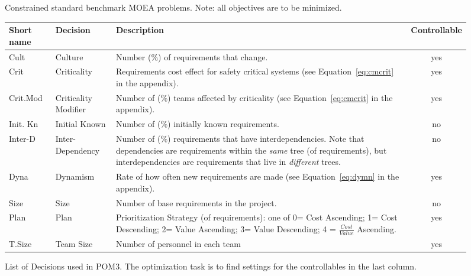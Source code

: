 \documentclass[10pt,journal,compsoc]{IEEEtran}
\newcommand{\eq}[1]{Equation~\ref{eq:#1}}
\begin{document}
\begin{figure*}
		\caption{Constrained standard benchmark MOEA problems. Note: all objectives
are to be  minimized.}\label{fig:con}
\end{figure*}


\begin{figure*}%
\scriptsize
    \centering
    \begin{tabular}{|l|l|p{4in}|c|}
        \hline
        Short name &Decision             & Description         &Controllable                                        \\ \hline
        Cult&Culture              & Number (\%) of requirements that change. & yes \\\hline
        Crit&Criticality           & Requirements cost effect for safety critical systems  (see \eq{cmcrit} in the appendix). & yes\\\hline
        Crit.Mod&Criticality Modifier & Number of (\%) teams affected by criticality   (see \eq{cmcrit} in the appendix).   & yes           \\ \hline
        Init. Kn&Initial Known        & Number of (\%) initially known requirements.             & no     \\ \hline
        Inter-D&Inter-Dependency     & Number of (\%) requirements that have interdependencies.  Note that dependencies are requirements within
the {\em same} tree (of requirements), but interdependencies are requirements that live in {\em different} trees.   & no            \\\hline
        Dyna&Dynamism             & Rate of how often new requirements are made (see \eq{dymn} in the appendix). & yes                    \\ \hline
        Size&Size            & Number of base requirements in the project.& no \\        \hline
        Plan&Plan                 & Prioritization Strategy (of requirements): one of
        0= Cost Ascending;  1= Cost Descending; 2= Value Ascending; 3= Value Descending;
        4 = $\frac{Cost}{Value}$ Ascending.
 & yes \\\hline
     T.Size&Team Size            & Number of personnel in each team   & yes                         \\ 
        \hline
    \end{tabular}
    \caption {List of Decisions used in POM3. 
The optimization task is to find settings for the controllables in the last column.
}\label{fig:pom3decisions}
\end{figure*}
\end{document}
